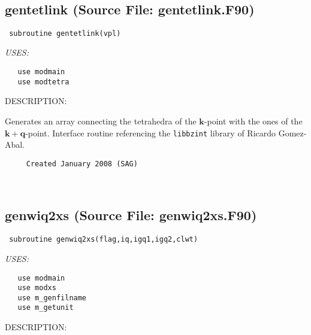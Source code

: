 \documentclass[11pt]{article}
\begin{document}

 
 
\mbox{}\hrulefill\ 
 
\subsection{gentetlink (Source File: gentetlink.F90)}


\begin{verbatim} subroutine gentetlink(vpl)\end{verbatim}{\em USES:}
\begin{verbatim}   use modmain
   use modtetra\end{verbatim}
{\sf DESCRIPTION:\\ }


     Generates an array connecting the tetrahedra of the $\mathbf{k}$-point with
     the ones of the  $\mathbf{k}+\mathbf{q}$-point. Interface routine
     referencing the {\tt libbzint} library of Ricardo Gomez-Abal.
  
\begin{verbatim}     Created January 2008 (SAG)\end{verbatim}






 
 
\mbox{}\hrulefill\ 
 
\subsection{genwiq2xs (Source File: genwiq2xs.F90)}


\begin{verbatim} subroutine genwiq2xs(flag,iq,igq1,igq2,clwt)\end{verbatim}{\em USES:}
\begin{verbatim}   use modmain
   use modxs
   use m_genfilname
   use m_getunit\end{verbatim}
{\sf DESCRIPTION:\\ }
\end{document}
